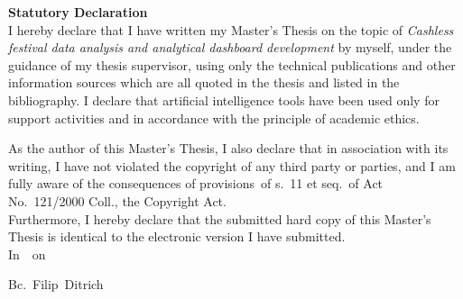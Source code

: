 \newpage
\pagestyle{empty}

\noindent
{\large\bfseries Statutory Declaration}\\

\noindent
I hereby declare that I have written my Master's Thesis on the topic of \textit{Cashless festival data analysis and analytical dashboard development} by myself, under the guidance of my thesis supervisor, using only the technical publications and other information sources which are all quoted in the thesis and listed in the bibliography.
I declare that artificial intelligence tools have been used only for support activities and in accordance with the principle of academic ethics.

As the author of this Master's Thesis, I also declare that in association with its writing, I have not violated the copyright of any third party or parties, and I am fully aware of the consequences of provisions~of s.~11 et seq.~of Act No.~121/2000 Coll., the Copyright Act.\\

Furthermore, I hereby declare that the submitted hard copy of this Master's Thesis is identical to the electronic version I have submitted.\\

\vspace{18mm}
\noindent
In~\makebox[4cm]{\dotfill}~on~\makebox[2.5cm]{\dotfill}
\hspace*{\fill}
\makebox[4cm]{\dotfill}

\begin{flushright}
	\noindent
	Bc.~Filip~Ditrich
\end{flushright}
